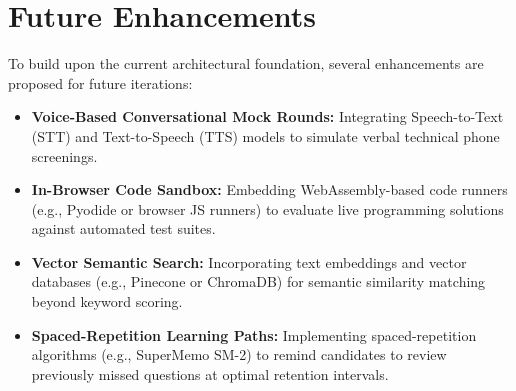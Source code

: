 \section{Future Enhancements}
To build upon the current architectural foundation, several enhancements are proposed for future iterations:
\begin{itemize}
    \item \textbf{Voice-Based Conversational Mock Rounds:} Integrating Speech-to-Text (STT) and Text-to-Speech (TTS) models to simulate verbal technical phone screenings.
    \item \textbf{In-Browser Code Sandbox:} Embedding WebAssembly-based code runners (e.g., Pyodide or browser JS runners) to evaluate live programming solutions against automated test suites.
    \item \textbf{Vector Semantic Search:} Incorporating text embeddings and vector databases (e.g., Pinecone or ChromaDB) for semantic similarity matching beyond keyword scoring.
    \item \textbf{Spaced-Repetition Learning Paths:} Implementing spaced-repetition algorithms (e.g., SuperMemo SM-2) to remind candidates to review previously missed questions at optimal retention intervals.
\end{itemize}
